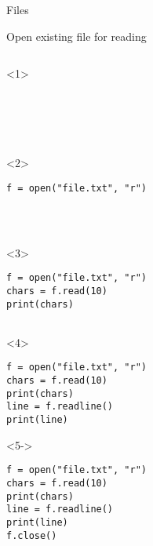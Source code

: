 \begin{frame}[fragile]{Files}

  Open existing file for reading

  \begin{columns}[onlytextwidth]
    \begin{column}{\textwidth}

      \begin{onlyenv}<1>
        \begin{lstlisting}[style=python]





 \end{lstlisting}
      \end{onlyenv}

      \begin{onlyenv}<2>
        \begin{lstlisting}[style=python]
f = open("file.txt", "r")




 \end{lstlisting}
      \end{onlyenv}

      \begin{onlyenv}<3>
        \begin{lstlisting}[style=python]
f = open("file.txt", "r")
chars = f.read(10)
print(chars)


 \end{lstlisting}
      \end{onlyenv}

      \begin{onlyenv}<4>
        \begin{lstlisting}[style=python]
f = open("file.txt", "r")
chars = f.read(10)
print(chars)
line = f.readline()
print(line)
 \end{lstlisting}
      \end{onlyenv}

      \begin{onlyenv}<5->
        \begin{lstlisting}[style=python]
f = open("file.txt", "r")
chars = f.read(10)
print(chars)
line = f.readline()
print(line)
f.close() \end{lstlisting}
      \end{onlyenv}

    \end{column}
  \end{columns}

\end{frame}


